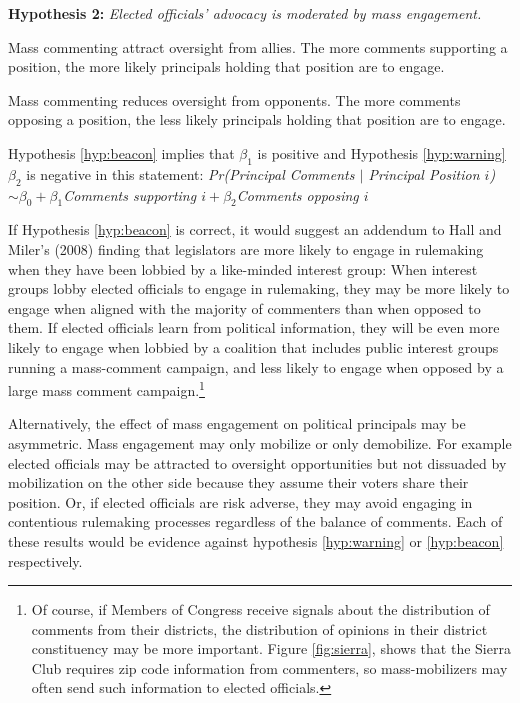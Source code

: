 \noindent \textbf{Hypothesis 2:}\textit{ Elected officials' advocacy is moderated by mass engagement.}

\begin{subhyp}


\begin{hyp} \label{hyp:beacon}
Mass commenting attract oversight from allies. The more comments supporting a position, the more likely principals holding that position are to engage.
\end{hyp}

\begin{hyp} \label{hyp:warning}
Mass commenting reduces oversight from opponents. The more comments opposing a position, the less likely principals holding that position are to engage.
\end{hyp}
\end{subhyp}

Hypothesis \ref{hyp:beacon} implies that $\beta_1$ is positive and Hypothesis \ref{hyp:warning} $\beta_2$ is negative in this statement: 
\textit{Pr(Principal Comments $|$ Principal Position $i$) $\sim \beta_0 + \beta_1$Comments supporting $i + \beta_2$Comments opposing $i$}

If Hypothesis \ref{hyp:beacon} is correct, it would suggest an addendum to Hall and Miler's (2008) finding that legislators are more likely to engage in rulemaking when they have been lobbied by a like-minded interest group: When interest groups lobby elected officials to engage in rulemaking, they may be more likely to engage when aligned with the majority of commenters than when opposed to them.
If elected officials learn from political information, they will be even more likely to engage when lobbied by a coalition that includes public interest groups running a mass-comment campaign, and less likely to engage when opposed by a large mass comment campaign.\footnote{Of course, if Members of Congress receive signals about the distribution of comments from their districts, the distribution of opinions in their district constituency may be more important. Figure \ref{fig:sierra}, shows that the Sierra Club requires zip code information from commenters, so mass-mobilizers may often send such information to elected officials.}

Alternatively, the effect of mass engagement on political principals may be asymmetric. Mass engagement may only mobilize or only demobilize. For example elected officials may be attracted to oversight opportunities but not dissuaded by mobilization on the other side because they assume their voters share their position. Or, if elected officials are risk adverse, they may avoid engaging in contentious rulemaking processes regardless of the balance of comments. Each of these results would be evidence against hypothesis \ref{hyp:warning} or \ref{hyp:beacon} respectively.


